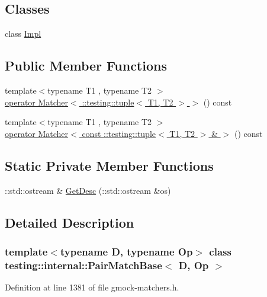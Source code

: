 \subsection*{Classes}
\begin{DoxyCompactItemize}
\item 
class \hyperlink{classtesting_1_1internal_1_1PairMatchBase_1_1Impl}{Impl}
\end{DoxyCompactItemize}
\subsection*{Public Member Functions}
\begin{DoxyCompactItemize}
\item 
{\footnotesize template$<$typename T1 , typename T2 $>$ }\\\hyperlink{classtesting_1_1internal_1_1PairMatchBase_ae73a3764537d725ce10e9e806ebdb417}{operator Matcher$<$ \+::testing\+::tuple$<$ T1, T2 $>$ $>$} () const
\item 
{\footnotesize template$<$typename T1 , typename T2 $>$ }\\\hyperlink{classtesting_1_1internal_1_1PairMatchBase_a0482f7e530420faecf00b9fca059b694}{operator Matcher$<$ const \+::testing\+::tuple$<$ T1, T2 $>$ \& $>$} () const
\end{DoxyCompactItemize}
\subsection*{Static Private Member Functions}
\begin{DoxyCompactItemize}
\item 
\+::std\+::ostream \& \hyperlink{classtesting_1_1internal_1_1PairMatchBase_afbc320d92000f77ec1ba276c26ec1a72}{Get\+Desc} (\+::std\+::ostream \&os)
\end{DoxyCompactItemize}


\subsection{Detailed Description}
\subsubsection*{template$<$typename D, typename Op$>$\newline
class testing\+::internal\+::\+Pair\+Match\+Base$<$ D, Op $>$}



Definition at line 1381 of file gmock-\/matchers.\+h.




